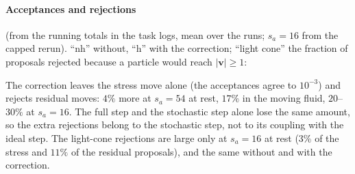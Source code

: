 \documentclass[11pt,aps,preprint,nofootinbib,superscriptaddress,tightenlines]{revtex4-2}
\let\oldparagraph\paragraph
\renewcommand{\paragraph}{\par\bigskip\oldparagraph}
\begin{document}
\paragraph{Acceptances and rejections} (from the running totals in the task logs, mean over the runs; $s_a=16$ from the capped rerun).  ``nh'' without, ``h'' with the correction; ``light cone'' the fraction of proposals rejected because a
particle would reach $|\bm v|\ge1$:
\begin{center}
\end{center}
The correction leaves the stress move alone (the acceptances agree to $10^{-3}$) and rejects residual moves: $4\%$ more at $s_a=54$ at rest, $17\%$
in the moving fluid, $20$--$30\%$ at $s_a=16$.  The full step and the stochastic step alone lose the same amount, so the extra rejections belong to
the stochastic step, not to its coupling with the ideal step.  The light-cone rejections are large only at $s_a=16$ at rest ($3\%$ of the stress and
$11\%$ of the residual proposals), and the same without and with the correction.
\end{document}
